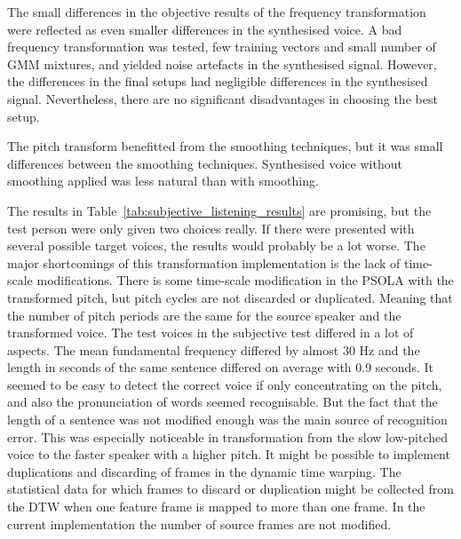The small differences in the objective results of the frequency transformation were reflected as even smaller differences in the synthesised voice. A bad frequency transformation was tested, \ie few training vectors and small number of GMM mixtures, and yielded noise artefacts in the synthesised signal. However, the differences in the final setups had negligible differences in the synthesised signal. Nevertheless, there are no significant disadvantages in choosing the best setup.

The pitch transform benefitted from the smoothing techniques, but it was small differences between the smoothing techniques. Synthesised voice without smoothing applied was less natural than with smoothing. 

The results in Table~\ref{tab:subjective_listening_results} are promising, but the test person were only given two choices really. If there were presented with several possible target voices, the results would probably be a lot worse. The major shortcomings of this transformation implementation is the lack of time-scale modifications. There is some time-scale modification in the PSOLA with the transformed pitch, but pitch cycles are not discarded or duplicated. Meaning that the number of pitch periods are the same for the source speaker and the transformed voice. The test voices in the subjective test differed in a lot of aspects. The mean fundamental frequency differed by almost 30 Hz and the length in seconds of the same sentence differed on average with 0.9 seconds. It seemed to be easy to detect the correct voice if only concentrating on the pitch, and also the pronunciation of words seemed recognisable. But the fact that the length of a sentence was not modified enough was the main source of recognition error. This was especially noticeable in transformation from the slow low-pitched voice to the faster speaker with a higher pitch. It might be possible to implement duplications and discarding of frames in the dynamic time warping. The statistical data for which frames to discard or duplication might be collected from the DTW when one feature frame is mapped to more than one frame. In the current implementation the number of source frames are not modified.


